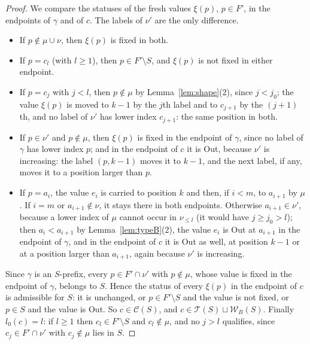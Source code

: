 \documentclass[11pt]{article}
\begin{document}
\begin{proof}
We compare the statuses of the fresh values $\xi(p)$, $p\in F'$, in
the endpoints of $\gamma$ and of $c$. The labels of $\nu'$ are the
only difference.
\begin{itemize}
\item If $p\notin\mu\cup\nu$, then $\xi(p)$ is fixed in both.
\item If $p=c_l$ (with $l\geq1$), then $p\in F'\setminus S$, and
 $\xi(p)$ is not fixed in either endpoint.
\item If $p=c_j$ with $j<l$, then $p\notin\mu$ by
 Lemma~\ref{lem:shape}(2), since $j<j_0$; the value $\xi(p)$ is moved
 to $k-1$ by the $j$th label and to $c_{j+1}$ by the $(j+1)$th, and no
 label of $\nu'$ has lower index $c_{j+1}$: the same position in both.
\item If $p\in\nu'$ and $p\notin\mu$, then $\xi(p)$ is fixed in the
 endpoint of $\gamma$, since no label of $\gamma$ has lower index $p$;
 and in the endpoint of $c$ it is Out, because $\nu'$ is increasing:
 the label $(p,k-1)$ moves it to $k-1$, and the next label, if any,
 moves it to a position larger than $p$.
\item If $p=a_i$, the value $e_i$ is carried to position $k$ and then,
 if $i<m$, to $a_{i+1}$ by $\mu$. If $i=m$ or $a_{i+1}\notin\nu$, it
 stays there in both endpoints. Otherwise $a_{i+1}\in\nu'$, because a
 lower index of $\mu$ cannot occur in $\nu_{\leq l}$ (it would have
 $j\geq j_0>l$); then $a_i<a_{i+1}$ by Lemma~\ref{lem:typeB}(2), the
 value $e_i$ is Out at $a_{i+1}$ in the endpoint of $\gamma$, and in
 the endpoint of $c$ it is Out as well, at position $k-1$ or at a
 position larger than $a_{i+1}$, again because $\nu'$ is increasing.
\end{itemize}
Since $\gamma$ is an $S$-prefix, every $p\in F'\cap\nu'$ with
$p\notin\mu$, whose value is fixed in the endpoint of $\gamma$,
belongs to $S$. Hence the status of every $\xi(p)$ in the endpoint of
$c$ is admissible for $S$: it is unchanged, or $p\in F'\setminus S$
and the value is not fixed, or $p\in S$ and the value is Out. So
$c\in\mathcal C(S)$, and $c\in\mathcal T(S)\sqcup\mathcal W_B(S)$.
Finally $l_0(c)=l$: if $l\geq1$ then $c_l\in F'\setminus S$ and
$c_l\notin\mu$, and no $j>l$ qualifies, since $c_j\in F'\cap\nu'$ with
$c_j\notin\mu$ lies in $S$.


\end{proof}
\end{document}
